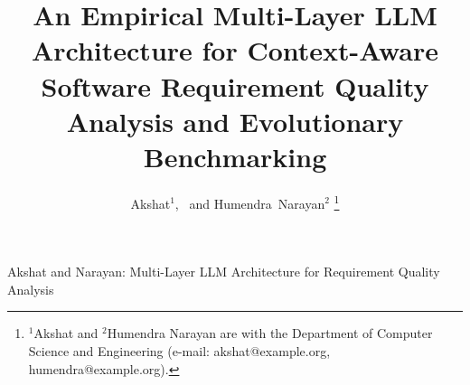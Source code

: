 \documentclass[journal]{IEEEtran}
\begin{document}
\title{An Empirical Multi-Layer LLM Architecture for Context-Aware Software Requirement Quality Analysis and Evolutionary Benchmarking}

\author{Akshat$^{1}$,~ and Humendra~Narayan$^{2}$%
\thanks{$^{1}$Akshat and $^{2}$Humendra Narayan are with the Department of Computer Science and Engineering (e-mail: akshat@example.org, humendra@example.org).}}

%
{Akshat and Narayan: Multi-Layer LLM Architecture for Requirement Quality Analysis}

\maketitle
\end{document}
